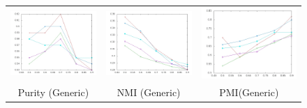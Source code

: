 \documentclass[10pt,a5paper,twoside]{article}
\begin{document}
\begin{figure}[t!]
\begin{center}
\resizebox{14cm}{!} 
{
	\begin{tabular}{ccc}
		\includegraphics[width=140pt]{Figs/1-1.jpg} & 
		\includegraphics[width=140pt]{Figs/1-2.jpg} & 
		\includegraphics[width=140pt]{Figs/1-3.jpg} \\  
	
		{\footnotesize Purity (Generic)} & {\footnotesize NMI (Generic)} & 
		{\footnotesize PMI(Generic)}\\
	

\end{tabular}}
\end{center}
\end{figure}
\end{document}
